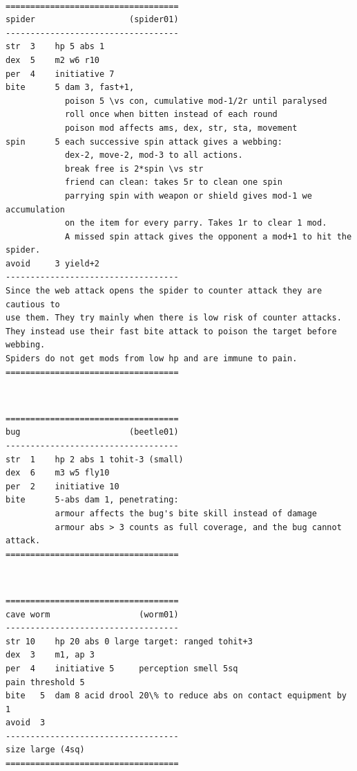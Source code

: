 \documentclass[11pt, twoside, titlepage, a4paper]{report}
\newcommand{\vs}{$\backslash\ $}  %
\begin{document}
\

\goodbreak \begin{samepage} \small \begin{verbatim}
===================================
spider                   (spider01)
-----------------------------------
str  3    hp 5 abs 1
dex  5    m2 w6 r10
per  4    initiative 7
bite      5 dam 3, fast+1,
            poison 5 \vs con, cumulative mod-1/2r until paralysed
            roll once when bitten instead of each round
            poison mod affects ams, dex, str, sta, movement
spin      5 each successive spin attack gives a webbing:
            dex-2, move-2, mod-3 to all actions.
            break free is 2*spin \vs str
            friend can clean: takes 5r to clean one spin
            parrying spin with weapon or shield gives mod-1 we accumulation
            on the item for every parry. Takes 1r to clear 1 mod.
            A missed spin attack gives the opponent a mod+1 to hit the spider.
avoid     3 yield+2
-----------------------------------
Since the web attack opens the spider to counter attack they are cautious to
use them. They try mainly when there is low risk of counter attacks.
They instead use their fast bite attack to poison the target before webbing.
Spiders do not get mods from low hp and are immune to pain.
===================================
\end{verbatim} \normalsize \end{samepage}

\

\goodbreak \begin{samepage} \small \begin{verbatim}
===================================
bug                      (beetle01)
-----------------------------------
str  1    hp 2 abs 1 tohit-3 (small)
dex  6    m3 w5 fly10
per  2    initiative 10
bite      5-abs dam 1, penetrating:
          armour affects the bug's bite skill instead of damage
          armour abs > 3 counts as full coverage, and the bug cannot attack.
===================================
\end{verbatim} \normalsize \end{samepage}

\

\goodbreak \begin{samepage} \small \begin{verbatim}
===================================
cave worm                  (worm01)
-----------------------------------
str 10    hp 20 abs 0 large target: ranged tohit+3
dex  3    m1, ap 3
per  4    initiative 5     perception smell 5sq
pain threshold 5
bite   5  dam 8 acid drool 20\% to reduce abs on contact equipment by 1
avoid  3
-----------------------------------
size large (4sq)
===================================
\end{verbatim} \normalsize \end{samepage}
\end{document}
